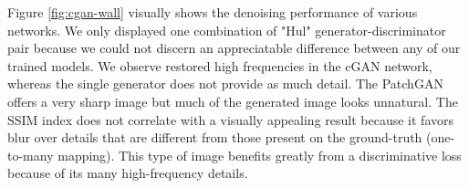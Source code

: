 Figure \ref{fig:cgan-wall} visually shows the denoising performance of various networks. We only displayed one combination of "Hul" generator-discriminator pair because we could not discern an appreciatable difference between any of our trained models. We observe restored high frequencies in the \ac{cGAN} network, whereas the single generator does not provide as much detail. The PatchGAN offers a very sharp image but much of the generated image looks unnatural. The SSIM index does not correlate with a visually appealing result because it favors blur over details that are different from those present on the ground-truth (one-to-many mapping). This type of image benefits greatly from a discriminative loss because of its many high-frequency details.








